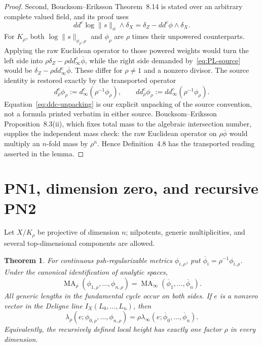 \documentclass[11pt]{article}
\newtheorem{theorem}{Theorem}
\newcommand{\MA}{\operatorname{MA}}
\newcommand{\norm}[1]{\lVert#1\rVert}
\begin{document}
\begin{proof}
Second, Boucksom--Eriksson Theorem~8.14 is stated over an arbitrary complete
valued field, and its proof uses
\[
 dd^c\log\norm{s}_{\phi}\wedge\delta_X
 =\delta_Z-dd^c\phi\wedge\delta_X.
\tag{1.7}\label{eq:PL-source}
\]
For $K_\rho$, both
$\log\norm{s}_{\phi_\rho,\rho}$ and $\phi_\rho$ are $\rho$ times their
unpowered counterparts.  Applying the raw Euclidean operator to those
powered weights would turn the left side into
$\rho\delta_Z-\rho dd^c_\infty\overline\phi$, while the right side demanded
by~\eqref{eq:PL-source} would be
$\delta_Z-\rho dd^c_\infty\overline\phi$.  These differ for
$\rho\ne1$ and a nonzero divisor.  The source identity is restored exactly
by the transported operator
\begin{equation}
 d^c_\rho\phi_\rho:=d^c_\infty(\rho^{-1}\phi_\rho),
 \qquad
 dd^c_\rho\phi_\rho:=dd^c_\infty(\rho^{-1}\phi_\rho).
\tag{1.8}\label{eq:ddc-unpacking}
\end{equation}
Equation~\eqref{eq:ddc-unpacking} is our explicit unpacking of the source
convention, not a formula printed verbatim in either source.
Boucksom--Eriksson Proposition~8.3(ii), which fixes total mass to the
algebraic intersection number, supplies the independent mass check: the raw
Euclidean operator on $\rho\overline\phi$ would multiply an $n$-fold mass
by $\rho^n$.  Hence Definition~4.8 has the transported reading asserted in
the lemma.
\end{proof}

\section{PN1, dimension zero, and recursive PN2}

Let $X/K_\rho$ be projective of dimension $n$; nilpotents, generic
multiplicities, and several top-dimensional components are allowed.

\begin{theorem}
\label{thm:powered-normalization}
For continuous psh-regularizable metrics $\phi_{i,\rho}$, put
$\overline\phi_i=\rho^{-1}\phi_{i,\rho}$.  Under the canonical
identification of analytic spaces,
\begin{equation}
 \MA_\rho(\phi_{1,\rho},\ldots,\phi_{n,\rho})
 =\MA_\infty(\overline\phi_1,\ldots,\overline\phi_n).
\tag{PN1}\label{eq:PN1-r3}
\end{equation}
All generic lengths in the fundamental cycle occur on both sides.  If $e$
is a nonzero vector in the Deligne line $I_X(L_0,\ldots,L_n)$, then
\begin{equation}
 \lambda_\rho(e;\phi_{0,\rho},\ldots,\phi_{n,\rho})
 =\rho\lambda_\infty
 (e;\overline\phi_0,\ldots,\overline\phi_n).
\tag{PN2}\label{eq:PN2-r3}
\end{equation}
Equivalently, the recursively defined local height has exactly one factor
$\rho$ in every dimension.
\end{theorem}
\end{document}
